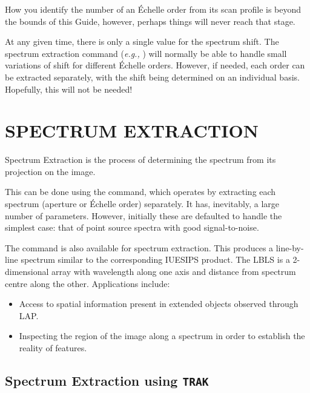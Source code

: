 How you identify the number of an \'{E}chelle order from its scan profile is
beyond the bounds of this Guide, however, perhaps things will never reach that
stage.

At any given time, there is only a single value for the spectrum shift.  The
spectrum extraction command ({\it{e.g.,}} ) will
normally be able to
handle small variations of shift for different \'{E}chelle orders.
However, if needed, each order can be extracted separately, with the shift
being determined on an individual basis.
Hopefully, this will not be needed\@!


\section{\label{se:spec_extr}SPECTRUM EXTRACTION}

Spectrum Extraction is the process of determining the spectrum from its
projection on the image.

This can be done using the 
 command, which operates by extracting
each spectrum (aperture or \'{E}chelle order) separately.  It has, inevitably,
a large number of parameters.  However, initially these are defaulted to
handle the simplest case: that of point source spectra with good
signal-to-noise.

The  command is also available for spectrum 
extraction.
This produces a line-by-line spectrum similar to the corresponding IUESIPS
product.  The LBLS is a 2-dimensional array with wavelength along one axis and
distance from spectrum centre along the other.  Applications include:

\begin{itemize}

\item Access to spatial information present in extended objects observed
      through LAP\@.

\item Inspecting the region of the image along a spectrum in order
      to establish the reality of features.

\end{itemize}


\subsection{\label{subse:trak}Spectrum Extraction using
            {\tt TRAK}}

